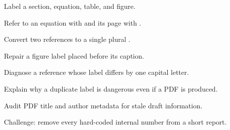 \chapterexercisestitle
\begin{chapterexercises}
  \item Label a section, equation, table, and figure.
  \item Refer to an equation with  and its page with .
  \item Convert two references to a single plural .
  \item Repair a figure label placed before its caption.
  \item Diagnose a reference whose label differs by one capital letter.
  \item Explain why a duplicate label is dangerous even if a PDF is produced.
  \item Audit PDF title and author metadata for stale draft information.
  \item Challenge: remove every hard-coded internal number from a short report.
\end{chapterexercises}
